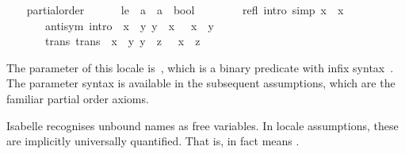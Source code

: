 \begin{isabellebody}
\begin{isamarkuptext}
\end{isamarkuptext}%
\isamarkuptrue%
\ \ \isamarkupfalse%
\ partial{\isacharunderscore}order\ {\isacharequal}\isanewline
\ \ \ \ \ le\ {\isacharcolon}{\isacharcolon}\ {\isachardoublequoteopen}{\isacharprime}a\ {\isasymRightarrow}\ {\isacharprime}a\ {\isasymRightarrow}\ bool{\isachardoublequoteclose}\ {\isacharparenleft}\ {\isachardoublequoteopen}{\isasymsqsubseteq}{\isachardoublequoteclose}\ {}{}{\isacharparenright}\isanewline
\ \ \ \ \ refl\ {\isacharbrackleft}intro{\isacharcomma}\ simp{\isacharbrackright}{\isacharcolon}\ {\isachardoublequoteopen}x\ {\isasymsqsubseteq}\ x{\isachardoublequoteclose}\isanewline
\ \ \ \ \ \ \ anti{\isacharunderscore}sym\ {\isacharbrackleft}intro{\isacharbrackright}{\isacharcolon}\ {\isachardoublequoteopen}{\isasymlbrakk}\ x\ {\isasymsqsubseteq}\ y{\isacharsemicolon}\ y\ {\isasymsqsubseteq}\ x\ {\isasymrbrakk}\ {\isasymLongrightarrow}\ x\ {\isacharequal}\ y{\isachardoublequoteclose}\isanewline
\ \ \ \ \ \ \ trans\ {\isacharbrackleft}trans{\isacharbrackright}{\isacharcolon}\ {\isachardoublequoteopen}{\isasymlbrakk}\ x\ {\isasymsqsubseteq}\ y{\isacharsemicolon}\ y\ {\isasymsqsubseteq}\ z\ {\isasymrbrakk}\ {\isasymLongrightarrow}\ x\ {\isasymsqsubseteq}\ z{\isachardoublequoteclose}%
\begin{isamarkuptext}%
The parameter of this locale is~,
  which is a binary predicate with infix syntax~\isa{{\isasymsqsubseteq}}.  The
  parameter syntax is available in the subsequent
  assumptions, which are the familiar partial order axioms.

  Isabelle recognises unbound names as free variables.  In locale
  assumptions, these are implicitly universally quantified.  That is,
   in fact means
  .


\end{isamarkuptext}
\end{isabellebody}
